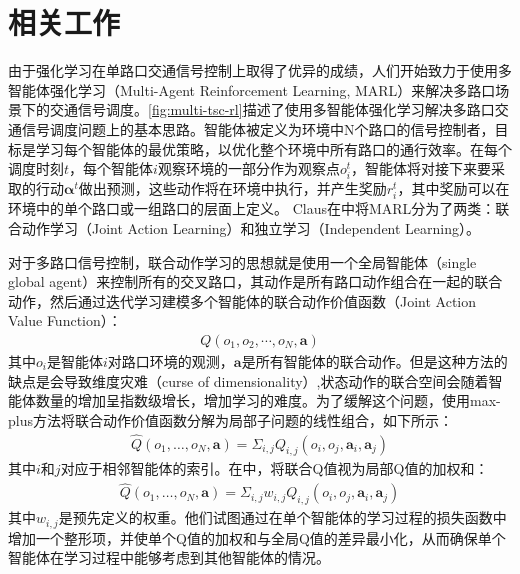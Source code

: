 \section{相关工作}
由于强化学习在单路口交通信号控制上取得了优异的成绩，人们开始致力于使用多智能体强化学习（Multi-Agent Reinforcement Learning, MARL）来解决多路口场景下的交通信号调度。\autoref{fig:multi-tsc-rl}描述了使用多智能体强化学习解决多路口交通信号调度问题上的基本思路。智能体被定义为环境中N个路口的信号控制者，目标是学习每个智能体的最优策略，以优化整个环境中所有路口的通行效率。在每个调度时刻$t$，每个智能体$i$观察环境的一部分作为观察点$o_i^t$，智能体将对接下来要采取的行动$\mathbf{\alpha}^t$做出预测，这些动作将在环境中执行，并产生奖励$r_i^t$，其中奖励可以在环境中的单个路口或一组路口的层面上定义。
Claus在中将MARL分为了两类：联合动作学习（Joint Action Learning）和独立学习（Independent Learning）。

对于多路口信号控制，联合动作学习的思想就是使用一个全局智能体（single global agent）来控制所有的交叉路口，其动作是所有路口动作组合在一起的联合动作，然后通过迭代学习建模多个智能体的联合动作价值函数（Joint Action Value Function）：
\begin{align}
  Q(o_1, o_2, \cdots, o_N, \mathbf{a})
\end{align}
其中$o_i$是智能体$i$对路口环境的观测，$\mathbf{a}$是所有智能体的联合动作。但是这种方法的缺点是会导致维度灾难（curse of dimensionality）,状态动作的联合空间会随着智能体数量的增加呈指数级增长，增加学习的难度。为了缓解这个问题，使用max-plus方法将联合动作价值函数分解为局部子问题的线性组合，如下所示：
\begin{align}
  \hat{Q}\left(o_{1}, \ldots, o_{N}, \mathbf{a}\right)=\Sigma_{i, j} Q_{i, j}\left(o_{i}, o_{j}, \mathbf{a}_{i}, \mathbf{a}_{j}\right)
\end{align}
其中$i \text{和} j$对应于相邻智能体的索引。在中，将联合Q值视为局部Q值的加权和：
\begin{align}
  \hat{Q}\left(o_{1}, \ldots, o_{N}, \mathbf{a}\right)=\Sigma_{i, j} w_{i, j} Q_{i, j}\left(o_{i}, o_{j}, \mathbf{a}_{i}, \mathbf{a}_{j}\right)
\end{align}
其中$w_{i,j}$是预先定义的权重。他们试图通过在单个智能体的学习过程的损失函数中增加一个整形项，并使单个Q值的加权和与全局Q值的差异最小化，从而确保单个智能体在学习过程中能够考虑到其他智能体的情况。

